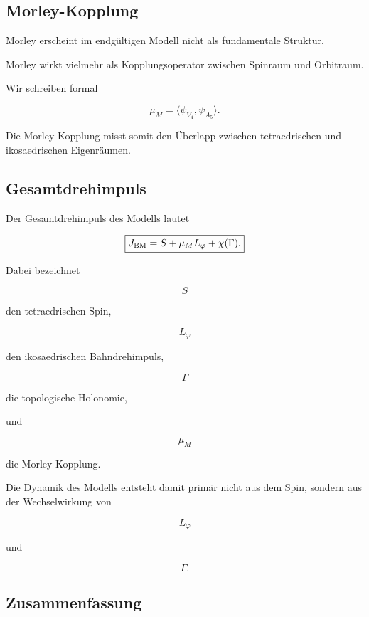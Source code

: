 \documentclass[11pt,a4paper]{article}
\theoremstyle{definition}
\theoremstyle{remark}
\begin{document}
	
	\subsection{Morley-Kopplung}
	
	Morley erscheint im endgültigen Modell
	nicht als fundamentale Struktur.
	
	Morley wirkt vielmehr als Kopplungsoperator
	zwischen Spinraum und Orbitraum.
	
	Wir schreiben formal
	
	\[
	\mu_M
	=
	\langle
	\psi_{V_4},
	\psi_{A_5}
	\rangle.
	\]
	
	Die Morley-Kopplung misst somit den Überlapp
	zwischen tetraedrischen und ikosaedrischen Eigenräumen.
	
	
	\subsection{Gesamtdrehimpuls}
	
	Der Gesamtdrehimpuls des Modells lautet
	
	\[
	\boxed{
	J_{\rm BM}
	=
	S
	+
	\mu_M L_\varphi
	+
	\chi(\Gamma).
	}
	\]
	
	Dabei bezeichnet
	
	\[
	S
	\]
	
	den tetraedrischen Spin,
	
	\[
	L_\varphi
	\]
	
	den ikosaedrischen Bahndrehimpuls,
	
	\[
	\Gamma
	\]
	
	die topologische Holonomie,
	
	und
	
	\[
	\mu_M
	\]
	
	die Morley-Kopplung.
	
	\bigskip
	
	Die Dynamik des Modells entsteht damit primär
	nicht aus dem Spin,
	sondern aus der Wechselwirkung von
	
	\[
	L_\varphi
	\]
	
	und
	
	\[
	\Gamma.
	\]
	
	
	\subsection{Zusammenfassung}
	
\end{document}
